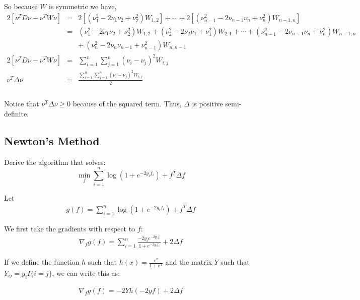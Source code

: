 \documentclass[a4paper]{article}
\begin{document}
So because $W$ is symmetric we have,\\

\begin{eqnarray}
  2\left[\nu^{T}D \nu-\nu^{T}W \nu\right] & = &
  2\left[\left(\nu_{1}^{2} - 2\nu_{1}\nu_{2} +
      \nu_{2}^{2}\right)W_{1,2}\right] + \cdots +
  2\left[\left(\nu_{n-1}^{2} - 2\nu_{n-1}\nu_{n} +
      \nu_{n}^{2}\right)W_{n-1,n}\right] \nonumber \\ 
  & = & \left(\nu_{1}^{2} - 2\nu_{1}\nu_{2} + \nu_{2}^{2}\right)W_{1,2}
  + \left(\nu_{2}^{2} - 2\nu_{2}\nu_{1} + \nu_{1}^{2}\right)W_{2,1} +
  \cdots + \left(\nu_{n-1}^{2} - 2\nu_{n-1}\nu_{n} +
    \nu_{n}^{2}\right)W_{n-1,n} \nonumber \\ 
  && +\> \left(\nu_{n}^{2} - 2\nu_{n}\nu_{n-1} + \nu_{n-1}^{2}\right)W_{n,n-1} \nonumber \\
  2\left[\nu^{T}D \nu-\nu^{T}W \nu\right] & = & \sum_{i=1}^{n}
  \sum_{j=1}^{n} \left(\nu_{i} - \nu_{j}\right)^{2}W_{i,j} \nonumber \\ 
  \nu^{T}\Delta \nu & = & \frac{\sum_{i=1}^{n} \sum_{j=1}^{n}
    \left(\nu_{i} - \nu_{j}\right)^{2}W_{i,j}}{2} \nonumber\\ 
\end{eqnarray}\\
Notice that $\nu^{T}\Delta \nu \geq 0$ because of the squared
term. Thus, $\Delta$ is positive semi-definite. 


\subsection{Newton's Method}
Derive the algorithm that solves:
$$\min_f \sum_{i=1}^{n} \log(1+e^{-2y_if_i}) + f^T \Delta f$$

Let
\begin{align*}
  g(f) = \sum_{i=1}^{n} \log(1+e^{-2y_if_i}) + f^T \Delta f
\end{align*}

We first take the gradients with respect to $f$:
\begin{align*}
  \nabla_f g(f) = \sum_{i=1}^n \frac{-2y_i e^{-2y_i f_i}}{1+e^{-2y_i f_i}} + 2\Delta f
\end{align*}

If we define the function $h$ such that $h(x) = \frac{e^x}{1+e^x}$ and
the matrix $Y$ such that $Y_{ij} = y_i I\{i=j\}$, we can write this as:

\begin{align*}
  \nabla_f g(f) = -2Yh(-2yf) + 2\Delta f
\end{align*}
\end{document}
